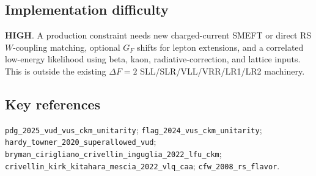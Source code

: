 \subsection*{Implementation difficulty}
\textbf{HIGH}.  A production constraint needs new charged-current SMEFT or
direct RS \(W\)-coupling matching, optional \(G_F\) shifts for lepton extensions,
and a correlated low-energy likelihood using beta, kaon, radiative-correction,
and lattice inputs.  This is outside the existing \(\Delta F=2\)
SLL/SLR/VLL/VRR/LR1/LR2 machinery.

\subsection*{Key references}
\texttt{pdg\_2025\_vud\_vus\_ckm\_unitarity};
\texttt{flag\_2024\_vus\_ckm\_unitarity};
\texttt{hardy\_towner\_2020\_superallowed\_vud};
\texttt{bryman\_cirigliano\_crivellin\_inguglia\_2022\_lfu\_ckm};
\texttt{crivellin\_kirk\_kitahara\_mescia\_2022\_vlq\_caa};
\texttt{cfw\_2008\_rs\_flavor}.
